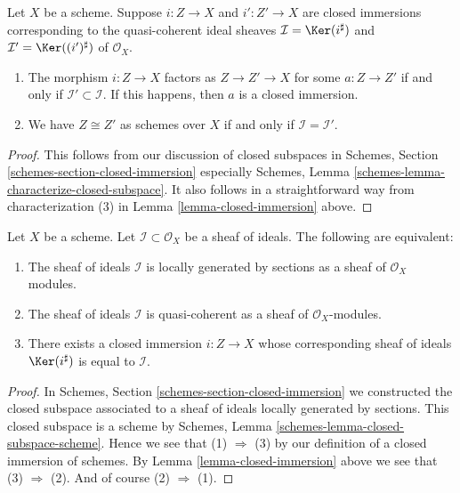 \begin{lemma}
\label{lemma-closed-immersion-ideals}
Let $X$ be a scheme.
Suppose $i : Z \to X$ and $i' : Z' \to X$ are closed immersions
corresponding to the quasi-coherent
ideal sheaves $\mathcal{I} = \Ker(i^\sharp)$
and $\mathcal{I}' = \Ker((i')^\sharp)$ of $\mathcal{O}_X$.
\begin{enumerate}
\item The morphism $i : Z \to X$ factors as $Z \to Z' \to X$
for some $a : Z \to Z'$
if and only if $\mathcal{I}' \subset \mathcal{I}$.
If this happens, then $a$ is a closed immersion.
\item We have $Z \cong Z'$ as schemes over $X$ if and only if
$\mathcal{I} = \mathcal{I}'$.
\end{enumerate}
\end{lemma}

\begin{proof}
This follows from our discussion of closed subspaces in
Schemes, Section \ref{schemes-section-closed-immersion} especially
Schemes, Lemma \ref{schemes-lemma-characterize-closed-subspace}.
It also follows in a straightforward way from characterization
(3) in Lemma \ref{lemma-closed-immersion} above.
\end{proof}

\begin{lemma}
\label{lemma-closed-immersion-bijection-ideals}
Let $X$ be a scheme.
Let $\mathcal{I} \subset \mathcal{O}_X$ be a sheaf of ideals.
The following are equivalent:
\begin{enumerate}
\item The sheaf of ideals $\mathcal{I}$ is locally generated by
sections as a sheaf of $\mathcal{O}_X$ modules.
\item The sheaf of ideals $\mathcal{I}$ is quasi-coherent as
a sheaf of $\mathcal{O}_X$-modules.
\item There exists a closed immersion $i : Z \to X$ whose
corresponding sheaf of ideals $\Ker(i^\sharp)$ is
equal to $\mathcal{I}$.
\end{enumerate}
\end{lemma}

\begin{proof}
In Schemes, Section \ref{schemes-section-closed-immersion} we constructed
the closed subspace associated to a sheaf of ideals locally generated
by sections. This closed subspace is a scheme by
Schemes, Lemma \ref{schemes-lemma-closed-subspace-scheme}.
Hence we see that (1) $\Rightarrow$ (3) by our definition
of a closed immersion of schemes. By Lemma \ref{lemma-closed-immersion}
above we see that (3) $\Rightarrow$ (2). And of course (2) $\Rightarrow$ (1).
\end{proof}

